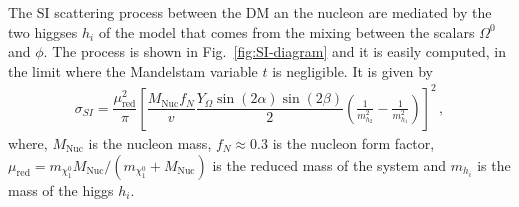 \documentclass[12pt,letterpaper]{article}
\begin{document}
%
The SI scattering process between the DM an the nucleon are mediated by the two higgses $h_i$ of the model that comes from the mixing between the scalars $\Omega^0$ and $\phi$. The process is shown in Fig.~\ref{fig:SI-diagram} and it is easily computed, in the limit where the  Mandelstam variable $t$ is negligible. It is given by
%
\begin{align}
\label{eq:sigma-SI}
\sigma_{SI}=\dfrac{\mu_{\text{red}}^2}{\pi}\left[\dfrac{M_{\text{Nuc}}f_N}{v}\dfrac{Y_{\Omega}\sin(2\alpha)\sin(2\beta)}{2}\left(\frac{1}{m_{h_2}^2}-\frac{1}{m_{h_1}^2}\right)\right]^2\,,
\end{align}
%
where, $M_{\text{Nuc}}$ is the nucleon mass, $f_N\approx 0.3$ is the nucleon form factor, $\mu_{\text{red}}= m_{\chi^0_1}M_{\text{Nuc}}/(m_{\chi^0_1}+M_{\text{Nuc}})$ is the reduced mass of the system and  $m_{h_i}$ is the mass of the higgs $h_i$.
\end{document}
